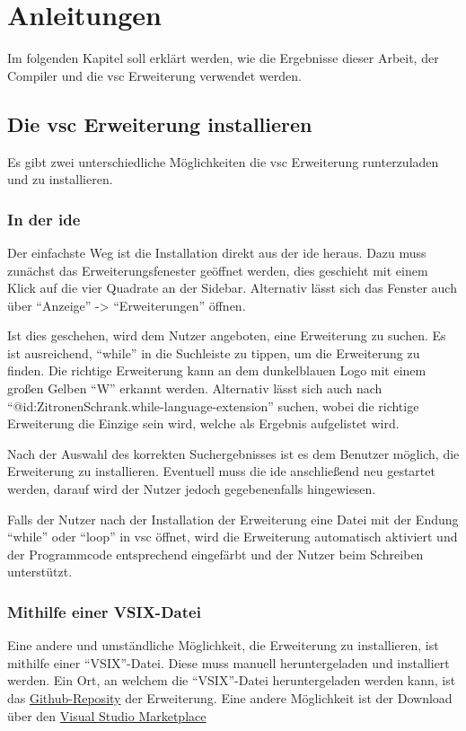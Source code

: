 \chapter{Anleitungen}
Im folgenden Kapitel soll erklärt werden, wie die Ergebnisse dieser Arbeit, der Compiler und die \ac{vsc} Erweiterung verwendet werden.

\section{Die \acs{vsc} Erweiterung installieren}
Es gibt zwei unterschiedliche Möglichkeiten die \ac{vsc} Erweiterung runterzuladen und zu installieren.

\subsection{In der \acs{ide}} 
Der einfachste Weg ist die Installation direkt aus der \ac{ide} heraus. Dazu muss zunächst das Erweiterungsfenester geöffnet werden, dies geschieht mit einem Klick auf die vier Quadrate an der Sidebar. Alternativ lässt sich das Fenster auch über \enquote{Anzeige} -> \enquote{Erweiterungen} öffnen.

Ist dies geschehen, wird dem Nutzer angeboten, eine Erweiterung zu suchen. Es ist ausreichend, \enquote{while} in die Suchleiste zu tippen, um die Erweiterung zu finden. Die richtige Erweiterung kann an dem dunkelblauen Logo mit einem großen Gelben \enquote{W} erkannt werden. Alternativ lässt sich auch nach \enquote{@id:ZitronenSchrank.while-language-extension} suchen, wobei die richtige Erweiterung die Einzige sein wird, welche als Ergebnis aufgelistet wird.

Nach der Auswahl des korrekten Suchergebnisses ist es dem Benutzer möglich, die Erweiterung zu installieren. Eventuell muss die \ac{ide} anschließend neu gestartet werden, darauf wird der Nutzer jedoch gegebenenfalls hingewiesen.

Falls der Nutzer nach der Installation der Erweiterung eine Datei mit der Endung \enquote{while} oder \enquote{loop} in \ac{vsc} öffnet, wird die Erweiterung automatisch aktiviert und der Programmcode entsprechend eingefärbt und der Nutzer beim Schreiben unterstützt.

\subsection{Mithilfe einer VSIX-Datei}
Eine andere und umständliche Möglichkeit, die Erweiterung zu installieren, ist mithilfe einer \enquote{VSIX}-Datei. Diese muss manuell heruntergeladen und installiert werden. Ein Ort, an welchem die \enquote{VSIX}-Datei heruntergeladen werden kann, ist das \href{https://github.com/ZitronenSchrank/While-Extension-VsCode}{Github-Reposity} der Erweiterung. Eine andere Möglichkeit ist der Download über den \href{https://marketplace.visualstudio.com/items?itemName=ZitronenSchrank.while-language-extension}{Visual Studio Marketplace}

